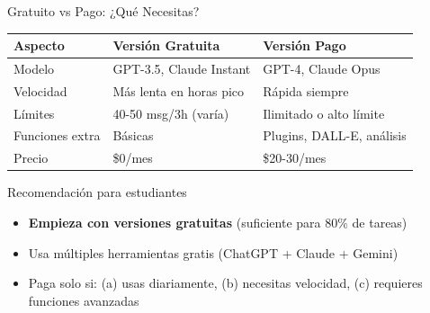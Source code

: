 \documentclass[aspectratio=169,xcolor={dvipsnames}]{beamer}
\begin{document}
	\begin{frame}{Gratuito vs Pago: ¿Qué Necesitas?}
		
		\begin{table}
			\centering
			\small
			\begin{tabular}{p{3cm}p{4.5cm}p{4.5cm}}
				\toprule
				\textbf{Aspecto} & \textbf{Versión Gratuita} & \textbf{Versión Pago} \\
				\midrule
				Modelo & GPT-3.5, Claude Instant & GPT-4, Claude Opus \\
				\addlinespace
				Velocidad & Más lenta en horas pico & Rápida siempre \\
				\addlinespace
				Límites & 40-50 msg/3h (varía) & Ilimitado o alto límite \\
				\addlinespace
				Funciones extra & Básicas & Plugins, DALL-E, análisis \\
				\addlinespace
				Precio & \$0/mes & \$20-30/mes \\
				\bottomrule
			\end{tabular}
		\end{table}
		
		\vspace{0.5cm}
		
		\begin{block}{Recomendación para estudiantes}
			\begin{itemize}
				\item \textbf{Empieza con versiones gratuitas} (suficiente para 80\% de tareas)
				\item Usa múltiples herramientas gratis (ChatGPT + Claude + Gemini)
				\item Paga solo si: (a) usas diariamente, (b) necesitas velocidad, (c) requieres funciones avanzadas
			\end{itemize}
		\end{block}
		
	\end{frame}
	
\end{document}
